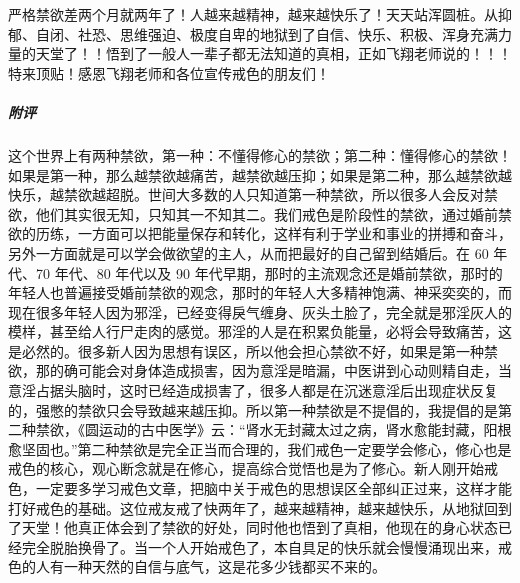 \begin{case}
    严格禁欲差两个月就两年了！人越来越精神，越来越快乐了！天天站浑圆桩。从抑郁、自闭、社恐、思维强迫、极度自卑的地狱到了自信、快乐、积极、浑身充满力量的天堂了！！悟到了一般人一辈子都无法知道的真相，正如飞翔老师说的！！！特来顶贴！感恩飞翔老师和各位宣传戒色的朋友们！
    \subparagraph{附评} 这个世界上有两种禁欲，第一种：不懂得修心的禁欲；第二种：懂得修心的禁欲！如果是第一种，那么越禁欲越痛苦，越禁欲越压抑；如果是第二种，那么越禁欲越快乐，越禁欲越超脱。世间大多数的人只知道第一种禁欲，所以很多人会反对禁欲，他们其实很无知，只知其一不知其二。我们戒色是阶段性的禁欲，通过婚前禁欲的历练，一方面可以把能量保存和转化，这样有利于学业和事业的拼搏和奋斗，另外一方面就是可以学会做欲望的主人，从而把最好的自己留到结婚后。在 60 年代、70 年代、80 年代以及 90 年代早期，那时的主流观念还是婚前禁欲，那时的年轻人也普遍接受婚前禁欲的观念，那时的年轻人大多精神饱满、神采奕奕的，而现在很多年轻人因为邪淫，已经变得戾气缠身、灰头土脸了，完全就是邪淫灰人的模样，甚至给人行尸走肉的感觉。邪淫的人是在积累负能量，必将会导致痛苦，这是必然的。很多新人因为思想有误区，所以他会担心禁欲不好，如果是第一种禁欲，那的确可能会对身体造成损害，因为意淫是暗漏，中医讲到心动则精自走，当意淫占据头脑时，这时已经造成损害了，很多人都是在沉迷意淫后出现症状反复的，强憋的禁欲只会导致越来越压抑。所以第一种禁欲是不提倡的，我提倡的是第二种禁欲，《圆运动的古中医学》云：“肾水无封藏太过之病，肾水愈能封藏，阳根愈坚固也。”第二种禁欲是完全正当而合理的，我们戒色一定要学会修心，修心也是戒色的核心，观心断念就是在修心，提高综合觉悟也是为了修心。新人刚开始戒色，一定要多学习戒色文章，把脑中关于戒色的思想误区全部纠正过来，这样才能打好戒色的基础。这位戒友戒了快两年了，越来越精神，越来越快乐，从地狱回到了天堂！他真正体会到了禁欲的好处，同时他也悟到了真相，他现在的身心状态已经完全脱胎换骨了。当一个人开始戒色了，本自具足的快乐就会慢慢涌现出来，戒色的人有一种天然的自信与底气，这是花多少钱都买不来的。
\end{case}

